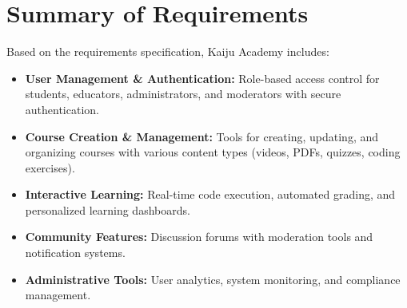 \documentclass[a4paper, 11pt]{scrreprt}
\begin{document}
\section{Summary of Requirements}
Based on the requirements specification, Kaiju Academy includes:

\begin{itemize}
    \item \textbf{User Management \& Authentication:} Role-based access control for students, educators, administrators, and moderators with secure authentication.
    
    \item \textbf{Course Creation \& Management:} Tools for creating, updating, and organizing courses with various content types (videos, PDFs, quizzes, coding exercises).
    
    \item \textbf{Interactive Learning:} Real-time code execution, automated grading, and personalized learning dashboards.
    
    \item \textbf{Community Features:} Discussion forums with moderation tools and notification systems.
    
    \item \textbf{Administrative Tools:} User analytics, system monitoring, and compliance management.
\end{itemize}
\end{document}
